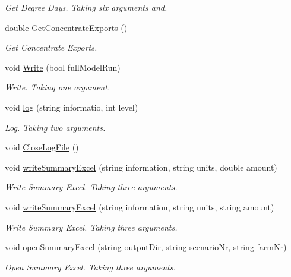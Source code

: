 \begin{DoxyCompactItemize}
\begin{DoxyCompactList}\small\item\em Get Degree Days. Taking six arguments and. \end{DoxyCompactList}\item 
double \mbox{\hyperlink{class_global_vars_a5dd795fb00a43c71cc25f921fde2dc06}{Get\+Concentrate\+Exports}} ()
\begin{DoxyCompactList}\small\item\em Get Concentrate Exports. \end{DoxyCompactList}\item 
void \mbox{\hyperlink{class_global_vars_af8ac71ca66dd50559a3ff31d6ef11e9a}{Write}} (bool full\+Model\+Run)
\begin{DoxyCompactList}\small\item\em Write. Taking one argument. \end{DoxyCompactList}\item 
void \mbox{\hyperlink{class_global_vars_a4b8a43181c226aed4b3334209f337ae2}{log}} (string informatio, int level)
\begin{DoxyCompactList}\small\item\em Log. Taking two arguments. \end{DoxyCompactList}\item 
void \mbox{\hyperlink{class_global_vars_ab3cfc89c4d656803191de79796e57793}{Close\+Log\+File}} ()
\item 
void \mbox{\hyperlink{class_global_vars_a99677a9c868e5b5b83e114e3f8f63100}{write\+Summary\+Excel}} (string information, string units, double amount)
\begin{DoxyCompactList}\small\item\em Write Summary Excel. Taking three arguments. \end{DoxyCompactList}\item 
void \mbox{\hyperlink{class_global_vars_a123a48cd4e07ce1e01555f150d093044}{write\+Summary\+Excel}} (string information, string units, string amount)
\begin{DoxyCompactList}\small\item\em Write Summary Excel. Taking three arguments. \end{DoxyCompactList}\item 
void \mbox{\hyperlink{class_global_vars_ae0867ba6d6225f173f8394a20925cbdf}{open\+Summary\+Excel}} (string output\+Dir, string scenario\+Nr, string farm\+Nr)
\begin{DoxyCompactList}\small\item\em Open Summary Excel. Taking three arguments. \end{DoxyCompactList}\item 

\end{DoxyCompactItemize}
